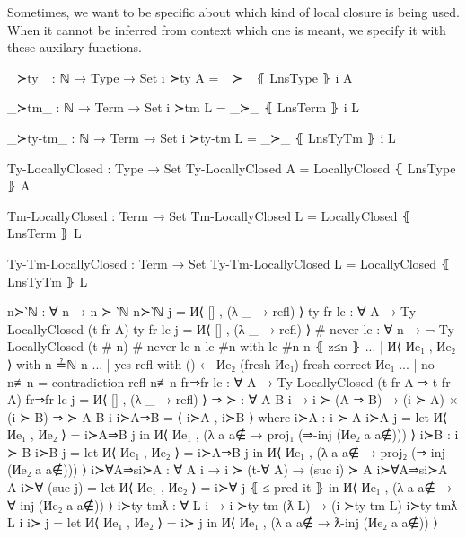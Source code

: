 \documentclass[logo,bsc,singlespacing,parskip,online]{infthesis}
\renewenvironment{code}{\mintedcopy[breaklines,breaksymbolleft=\;]{agda}}{\endmintedcopy}
\begin{document}
Sometimes, we want to be specific about which kind of local closure is being used. When it cannot be
inferred from context which one is meant, we specify it with these auxilary functions.

\begin{code}
  _≻ty_ : ℕ → Type → Set
  i ≻ty A = _≻_ ⦃ LnsType ⦄ i A

  _≻tm_ : ℕ → Term → Set
  i ≻tm L = _≻_ ⦃ LnsTerm ⦄ i L

  _≻ty-tm_ : ℕ → Term → Set
  i ≻ty-tm L = _≻_ ⦃ LnsTyTm ⦄ i L

  Ty-LocallyClosed : Type → Set
  Ty-LocallyClosed A = LocallyClosed ⦃ LnsType ⦄ A

  Tm-LocallyClosed : Term → Set
  Tm-LocallyClosed L = LocallyClosed ⦃ LnsTerm ⦄ L

  Ty-Tm-LocallyClosed : Term → Set
  Ty-Tm-LocallyClosed L = LocallyClosed ⦃ LnsTyTm ⦄ L
\end{code}

\begin{code}
  n≻‵ℕ : ∀ {n} → n ≻ ‵ℕ
  n≻‵ℕ j = И⟨ [] , (λ _ → refl) ⟩
  ty-fr-lc : ∀ {A} → Ty-LocallyClosed (t-fr A)
  ty-fr-lc j = И⟨ [] , (λ _ → refl) ⟩
  #-never-lc : ∀ {n} → ¬ Ty-LocallyClosed (t-# n)
  #-never-lc {n} lc-#n with lc-#n n ⦃ z≤n ⦄
  ... | И⟨ Иe₁ , Иe₂ ⟩ with n ≟ℕ n
  ...   | yes refl with () ← Иe₂ (fresh Иe₁) {fresh-correct Иe₁}
  ...   | no  n≢n  = contradiction refl n≢n
  fr⇒fr-lc : ∀ {A} → Ty-LocallyClosed (t-fr A ⇒ t-fr A)
  fr⇒fr-lc j = И⟨ [] , (λ _ → refl) ⟩
  ⇒-≻ : ∀ {A B i} → i ≻ (A ⇒ B) → (i ≻ A) × (i ≻ B)
  ⇒-≻ {A} {B} {i} i≻A⇒B = ⟨ i≻A , i≻B ⟩
    where
      i≻A : i ≻ A
      i≻A j = let И⟨ Иe₁ , Иe₂ ⟩ = i≻A⇒B j
        in И⟨ Иe₁ , (λ a {a∉} → proj₁ (⇒-inj (Иe₂ a {a∉}))) ⟩
      i≻B : i ≻ B
      i≻B j = let И⟨ Иe₁ , Иe₂ ⟩ = i≻A⇒B j
        in И⟨ Иe₁ , (λ a {a∉} → proj₂ (⇒-inj (Иe₂ a {a∉}))) ⟩
  i≻∀A⇒si≻A : ∀ {A i} → i ≻ (t-∀ A) → (suc i) ≻ A
  i≻∀A⇒si≻A {A} i≻∀ (suc j) =
    let И⟨ Иe₁ , Иe₂ ⟩ = i≻∀ j ⦃ ≤-pred it ⦄
    in И⟨ Иe₁ , (λ a {a∉} → ∀-inj (Иe₂ a {a∉})) ⟩
  i≻ty-tmƛ : ∀ {L i} → i ≻ty-tm (ƛ L) → (i ≻ty-tm L)
  i≻ty-tmƛ {L} {i} i≻ j = let И⟨ Иe₁ , Иe₂ ⟩ = i≻ j
    in И⟨ Иe₁ , (λ a {a∉} → ƛ-inj (Иe₂ a {a∉})) ⟩
\end{code}
\end{document}
